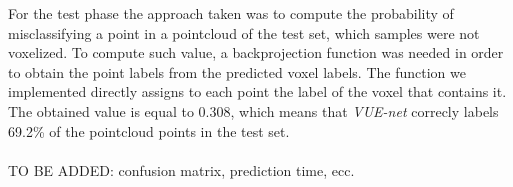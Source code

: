 For the test phase the approach taken was to compute the probability of misclassifying 
a point in a pointcloud of the test set, which samples were not voxelized.
To compute such value, a backprojection function was needed in order to obtain the point labels
from the predicted voxel labels. The function we implemented directly assigns to each point
the label of the voxel that contains it. The obtained value is equal to 0.308, which means that
\textit{VUE-net} correcly labels 69.2\% of the pointcloud points in the test set.
\\ \\
TO BE ADDED: confusion matrix, prediction time, ecc.